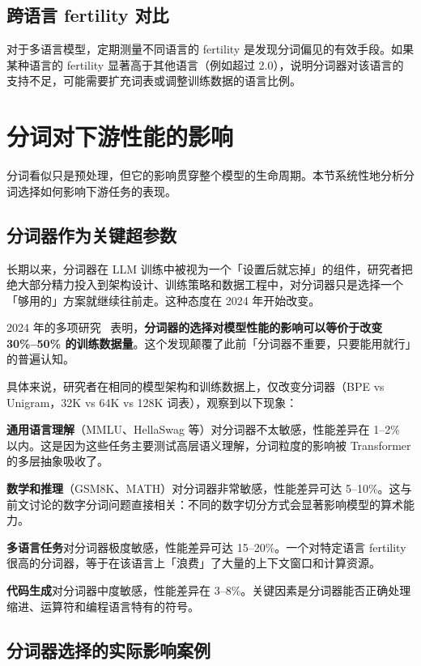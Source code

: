 \subsection{跨语言 fertility 对比}

对于多语言模型，定期测量不同语言的 fertility 是发现分词偏见的有效手段。如果某种语言的 fertility 显著高于其他语言（例如超过 2.0），说明分词器对该语言的支持不足，可能需要扩充词表或调整训练数据的语言比例。

\section{分词对下游性能的影响}

分词看似只是预处理，但它的影响贯穿整个模型的生命周期。本节系统性地分析分词选择如何影响下游任务的表现。

\subsection{分词器作为关键超参数}

长期以来，分词器在 LLM 训练中被视为一个「设置后就忘掉」的组件，研究者把绝大部分精力投入到架构设计、训练策略和数据工程中，对分词器只是选择一个「够用的」方案就继续往前走。这种态度在 2024 年开始改变。

2024 年的多项研究~\cite{goldman2024tokenizer} 表明，\textbf{分词器的选择对模型性能的影响可以等价于改变 30\%--50\% 的训练数据量}。这个发现颠覆了此前「分词器不重要，只要能用就行」的普遍认知。

具体来说，研究者在相同的模型架构和训练数据上，仅改变分词器（BPE vs Unigram，32K vs 64K vs 128K 词表），观察到以下现象：

\textbf{通用语言理解}（MMLU、HellaSwag 等）对分词器不太敏感，性能差异在 1--2\% 以内。这是因为这些任务主要测试高层语义理解，分词粒度的影响被 Transformer 的多层抽象吸收了。

\textbf{数学和推理}（GSM8K、MATH）对分词器非常敏感，性能差异可达 5--10\%。这与前文讨论的数字分词问题直接相关：不同的数字切分方式会显著影响模型的算术能力。

\textbf{多语言任务}对分词器极度敏感，性能差异可达 15--20\%。一个对特定语言 fertility 很高的分词器，等于在该语言上「浪费」了大量的上下文窗口和计算资源。

\textbf{代码生成}对分词器中度敏感，性能差异在 3--8\%。关键因素是分词器能否正确处理缩进、运算符和编程语言特有的符号。

\subsection{分词器选择的实际影响案例}

